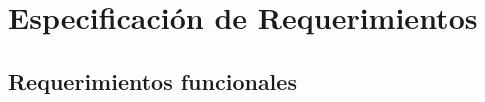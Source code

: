 %
%
%
%
\newcommand{\casodeuso}[6]{%
  \subsubsection*{#1. #2}
  \textit{Actor:} #3

  \textit{Precondición:} #4

  \textit{Flujo:} #5

  \textit{Postcondición:} #6\par}
\section{Especificación de Requerimientos}
\label{sec:requerimientos}

\subsection{Requerimientos funcionales}
\label{sec:req-funcionales}

